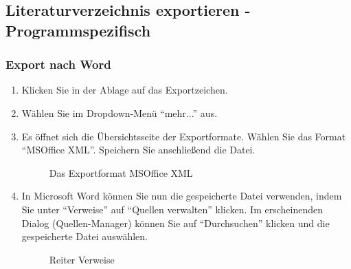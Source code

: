 \subsection{Literaturverzeichnis exportieren - Programmspezifisch}
\label{subsec:lvExportProgramme}
\subsubsection*{Export nach Word}  \label{sss:exportWord}
\begin{enumerate}
    \item Klicken Sie in der Ablage auf das Exportzeichen.
    \item Wählen Sie im Dropdown-Menü \enquote{mehr...} aus.
    \item Es öffnet sich die Übersichtsseite der Exportformate. Wählen Sie das Format \enquote{MSOffice XML}. Speichern Sie anschließend die Datei.
\begin{figure}[h!]
 \centering
 \caption{Das Exportformat MSOffice XML}
 \label{fig:exportformatMSOfficeXml}
\end{figure}
    \item In Microsoft Word können Sie nun die gespeicherte Datei verwenden, indem Sie unter \enquote{Verweise} auf \enquote{Quellen verwalten} klicken. Im erscheinenden Dialog (Quellen-Manager) können Sie auf \enquote{Durchsuchen} klicken und die gespeicherte Datei auswählen.
\begin{figure}[h!]
 \centering
 \caption{Reiter Verweise}

\end{figure}
\end{enumerate}
